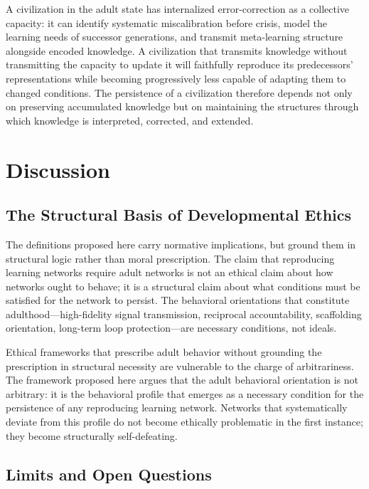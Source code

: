 \documentclass[11pt]{article}
\begin{document}
A civilization in the adult state has internalized error-correction as a collective
capacity: it can identify systematic miscalibration before crisis, model the learning needs
of successor generations, and transmit meta-learning structure alongside encoded knowledge.
A civilization that transmits knowledge without transmitting the capacity to update it will
faithfully reproduce its predecessors' representations while becoming progressively less
capable of adapting them to changed conditions. The persistence of a civilization therefore
depends not only on preserving accumulated knowledge but on maintaining the structures
through which knowledge is interpreted, corrected, and extended.

\section{Discussion}

\subsection{The Structural Basis of Developmental Ethics}

The definitions proposed here carry normative implications, but ground them in structural
logic rather than moral prescription. The claim that reproducing learning networks require
adult networks is not an ethical claim about how networks ought to behave; it is a structural
claim about what conditions must be satisfied for the network to persist. The behavioral
orientations that constitute adulthood---high-fidelity signal transmission, reciprocal
accountability, scaffolding orientation, long-term loop protection---are necessary
conditions, not ideals.

Ethical frameworks that prescribe adult behavior without grounding the prescription in
structural necessity are vulnerable to the charge of arbitrariness. The framework proposed
here argues that the adult behavioral orientation is not arbitrary: it is the behavioral
profile that emerges as a necessary condition for the persistence of any reproducing
learning network. Networks that systematically deviate from this profile do not become
ethically problematic in the first instance; they become structurally self-defeating.

\subsection{Limits and Open Questions}
\end{document}
